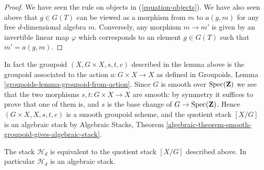 \begin{proof}
We have seen the rule on objects in (\ref{equation-objects}).
We have also seen above that $g \in G(T)$ can be viewed as
a morphism from $m$ to $a(g, m)$ for any free $d$-dimensional algebra $m$.
Conversely, any morphism $m \to m'$ is given by an invertible linear
map $\varphi$ which corresponds to an element $g \in G(T)$ such
that $m' = a(g, m)$.
\end{proof}

\noindent
In fact the groupoid $(X, G \times X, s, t, c)$ described in the
lemma above is the groupoid associated to the action $a : G \times X \to X$
as defined in
Groupoids, Lemma \ref{groupoids-lemma-groupoid-from-action}.
Since $G$ is smooth over $\mathop{\mathrm{Spec}}(\mathbf{Z})$
we see that the two morphisms $s, t : G \times X \to X$ are
smooth: by symmetry it suffices to prove that one of them is, and
$s$ is the base change of $G \to \mathop{\mathrm{Spec}}(\mathbf{Z})$.
Hence $(G \times X, X, s, t, c)$ is a smooth groupoid scheme,
and the quotient stack $[X/G]$ is an algebraic stack by
Algebraic Stacks,
Theorem \ref{algebraic-theorem-smooth-groupoid-gives-algebraic-stack}.

\begin{proposition}
\label{proposition-finite-hilbert-point}
The stack $\mathcal{H}_d$ is equivalent to the quotient stack
$[X/G]$ described above. In particular $\mathcal{H}_d$ is an
algebraic stack.
\end{proposition}

